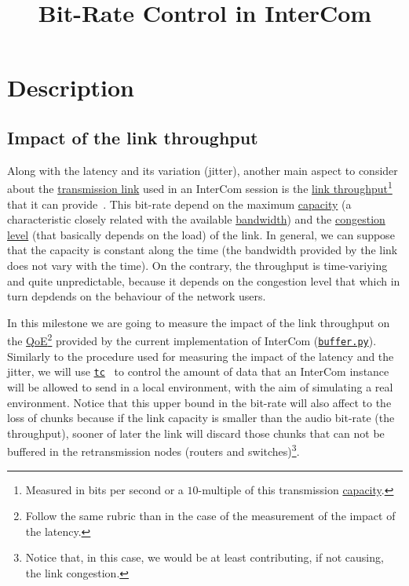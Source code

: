 
\title{Bit-Rate Control in InterCom}


\maketitle

\tableofcontents

\section{Description}
\subsection{Impact of the link throughput}
Along with the latency and its variation (jitter), another main aspect
to consider about the
\href{https://en.wikipedia.org/wiki/Telecommunications_link}{transmission
  link} used in an InterCom session is the
\href{https://en.wikipedia.org/wiki/Channel_capacityhttps://en.wikipedia.org/wiki/Network_throughput}{link
  throughput}\footnote{Measured in bits per second or a $10$-multiple
  of this transmission
  \href{https://en.wikipedia.org/wiki/Bandwidth_(computing)}{capacity}.}
that it can provide~\cite{Forouzan,Tanenbaum}. This bit-rate depend on
the maximum
\href{https://en.wikipedia.org/wiki/Channel_capacity}{capacity} (a
characteristic closely related with the available
\href{https://en.wikipedia.org/wiki/Bandwidth_(signal_processing)}{bandwidth})
and the
\href{https://en.wikipedia.org/wiki/Network_congestion}{congestion
  level} (that basically depends on the load) of the link. In general,
we can suppose that the capacity is constant along the time (the
bandwidth provided by the link does not vary with the time). On the
contrary, the throughput is time-variying and quite unpredictable,
because it depends on the congestion level that which in turn depdends
on the behaviour of the network users.

In this milestone we are going to measure the impact of the link
throughput on the
\href{https://en.wikipedia.org/wiki/Quality_of_experience}{QoE}\footnote{Follow
  the same rubric than in the case of the measurement of the impact of
  the latency.} provided by the current implementation of InterCom
(\href{https://github.com/Tecnologias-multimedia/InterCom/blob/master/src/buffer.py}{\texttt{buffer.py}}). Similarly
to the procedure used for measuring the impact of the latency and the
jitter, we will use
\href{https://man7.org/linux/man-pages/man8/tc.8.html}{\texttt{tc}}~\cite{bert2012lartc}
to control the amount of data that an InterCom instance will be
allowed to send in a local environment, with the aim of simulating a
real environment. Notice that this upper bound in the bit-rate will
also affect to the loss of chunks because if the link capacity is
smaller than the audio bit-rate (the throughput), sooner of later the
link will discard those chunks that can not be buffered in the
retransmission nodes (routers and switches)\footnote{Notice that, in
  this case, we would be at least contributing, if not causing, the
  link congestion.}.


